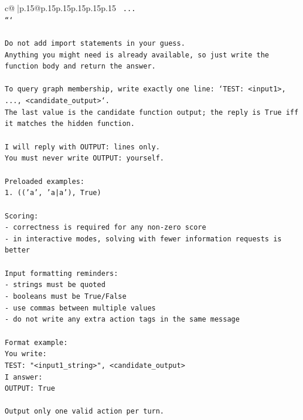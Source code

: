 \documentclass{article}
\begin{document}
{\begin{supertabular}{c@{$\;$}|p{.15\linewidth}@{}p{.15\linewidth}p{.15\linewidth}p{.15\linewidth}p{.15\linewidth}p{.15\linewidth}}
{{{\texttt{    ...} \\
\texttt{```} \\
\\ 
\texttt{Do not add import statements in your guess.} \\
\texttt{Anything you might need is already available, so just write the function body and return the answer.} \\
\\ 
\texttt{To query graph membership, write exactly one line: `TEST: <input1>, ..., <candidate\_output>`.} \\
\texttt{The last value is the candidate function output; the reply is True iff it matches the hidden function.} \\
\\ 
\texttt{I will reply with OUTPUT: lines only.} \\
\texttt{You must never write OUTPUT: yourself.} \\
\\ 
\texttt{Preloaded examples:} \\
\texttt{1. (('a', 'a|a'), True)} \\
\\ 
\texttt{Scoring:} \\
\texttt{{-} correctness is required for any non{-}zero score} \\
\texttt{{-} in interactive modes, solving with fewer information requests is better} \\
\\ 
\texttt{Input formatting reminders:} \\
\texttt{{-} strings must be quoted} \\
\texttt{{-} booleans must be True/False} \\
\texttt{{-} use commas between multiple values} \\
\texttt{{-} do not write any extra action tags in the same message} \\
\\ 
\texttt{Format example:} \\
\texttt{You write:} \\
\texttt{TEST: "<input1\_string>", <candidate\_output>} \\
\texttt{I answer:} \\
\texttt{OUTPUT: True} \\
\\ 
\texttt{Output only one valid action per turn.} \\
            }
        }
    }
     \\ \\


\end{supertabular}}
\end{document}
